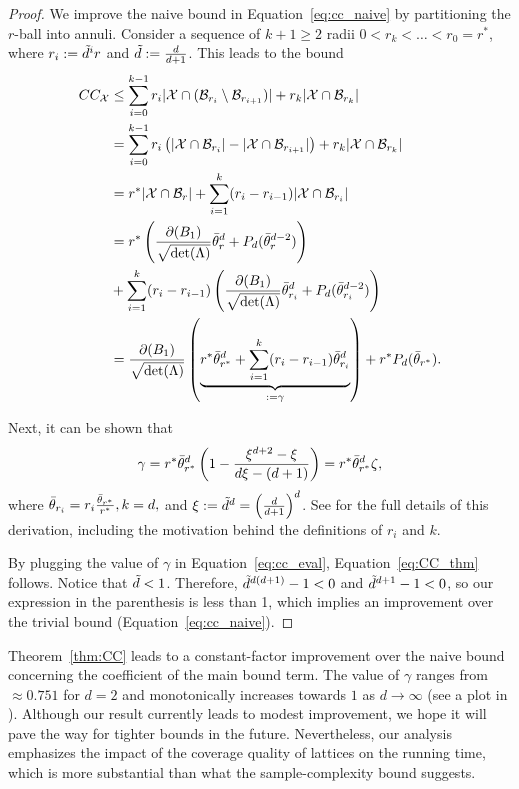 \begin{proof}
  We improve the naive bound in Equation~\eqref{eq:cc_naive} by partitioning the $r$-ball into annuli. Consider a sequence of ${k+1\geq 2}$  radii ${0<r_k<\ldots<r_0=r^*}$, where $r_i:=\tilde{d}^i r$ and $\tilde{d}:=\frac{d}{d+1}$. This leads to the bound
\begin{align}
\label{eq:cc_eval}
CC_{\mathcal{X}}&\leq \sum_{i=0}^{k-1}r_i |\mathcal{X}\cap (\mathcal{B}_{r_i}\setminus \mathcal{B}_{r_{i+1}})| + r_k|\mathcal{X}\cap \mathcal{B}_{r_k}|\nonumber\\
  &= \sum_{i=0}^{k-1}r_i\left(|\mathcal{X}\cap \mathcal{B}_{r_i}|- |\mathcal{X}\cap \mathcal{B}_{r_{i+1}}|\right)+ r_k|\mathcal{X}\cap \mathcal{B}_{r_k}| \nonumber\\
  &= r^*|\mathcal{X}\cap \mathcal{B}_{r}| + \sum_{i=1}^{k}(r_i - r_{i-1})|\mathcal{X}\cap \mathcal{B}_{r_i}| \nonumber\\
  & =r^*\left(\frac{\partial(B_1)}{\sqrt{\det(\Lambda)}}\Bar{\theta}^d_{r} +P_d(\Bar{\theta}^{d-2}_{r})\right) \nonumber\\&+ \sum_{i=1}^{k}(r_i - r_{i-1}) \left(\frac{\partial(B_1)}{\sqrt{\det(\Lambda)}}\Bar{\theta}^d_{r_i} +P_d(\Bar{\theta}^{d-2}_{r_i})\right) \nonumber\\
  &= \frac{\partial(B_1)}{\sqrt{\det(\Lambda)}} \left(\underbrace{r^* \Bar{\theta}^d_{r^*} + \sum_{i=1}^k(r_i-r_{i-1}) \Bar{\theta}^d_{r_i}}_{:=\gamma}\right) + r^* P_d(\Bar{\theta}_{r^*}).
\end{align}

Next, it can be shown that  
\[\gamma= r^* \Bar{\theta}^d_{r^*} \left(1 - \frac{\xi^{d+2} - \xi}{ d\xi - (d+1)}\right)=r^* \Bar{\theta}^d_{r^*} \zeta,\]
where 
$\Bar{\theta}_{r_i}= r_i\frac{\Bar{\theta}_{r^*}}{r^*}, k=d,$ and $\xi:=\tilde{d}^d=\left(\frac{d}{d+1}\right)^d$. See  for the full details of this derivation, including the motivation behind the definitions of $r_i$ and $k$.

By plugging the value of $\gamma$ in Equation~\eqref{eq:cc_eval}, Equation~\eqref{eq:CC_thm} follows. 
Notice that $\tilde{d} < 1$. Therefore, $\tilde{d}^{d(d+1)}-1 < 0$ and $\tilde{d}^{d+1} - 1 < 0$, so our expression in the parenthesis is less than 1, which implies an improvement over the trivial bound (Equation~\eqref{eq:cc_naive}). 
\end{proof}

Theorem~\ref{thm:CC} leads to a constant-factor improvement over the naive bound concerning the coefficient of the main bound term.  The value of $\gamma$  ranges from $\approx 0.751$ for $d=2$ and monotonically increases towards $1$ as $d\rightarrow\infty$ (see a plot in ).  Although our result currently leads to modest improvement, we hope it will pave the way for tighter bounds in the future. Nevertheless, our analysis emphasizes the impact of the coverage quality of lattices on the running time, which is more substantial than what the sample-complexity bound suggests. 

